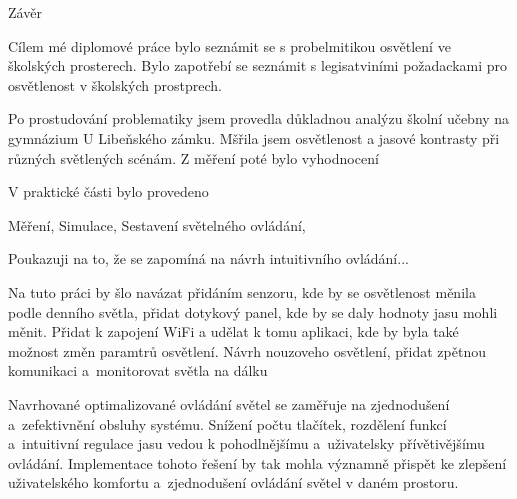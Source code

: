 \chap Závěr

Cílem mé diplomové práce bylo seznámit se s probelmitikou osvětlení ve školských prosterech. Bylo zapotřebí se seznámit s legisatviními požadackami
pro osvětlenost v školských prostprech.

Po prostudování problematiky jsem provedla důkladnou analýzu školní učebny na gymnázium U Libeňského zámku. Mšřila jsem osvětlenost a jasové kontrasty při
různých světlených scénám. Z měření poté bylo vyhodnocení

V praktické části bylo provedeno

Měření, Simulace, Sestavení světelného ovládání,

Poukazuji na to, že se zapomíná na návrh intuitivního ovládání...

Na tuto práci by šlo navázat přidáním senzoru, kde by se osvětlenost měnila podle denního světla, přidat dotykový panel, kde by se daly hodnoty
jasu mohli měnit. Přidat k zapojení WiFi a udělat k tomu aplikaci, kde by byla také možnost změn paramtrů osvětlení.
Návrh nouzoveho osvětlení, přidat zpětnou komunikaci a~monitorovat světla na dálku

Navrhované optimalizované ovládání světel se zaměřuje na zjednodušení a~zefektivnění obsluhy systému.
Snížení počtu tlačítek, rozdělení funkcí a~intuitivní regulace jasu vedou
k pohodlnějšímu a~uživatelsky přívětivějšímu ovládání.
Implementace tohoto řešení by tak mohla významně přispět
ke zlepšení uživatelského komfortu a~zjednodušení ovládání světel v daném prostoru.

